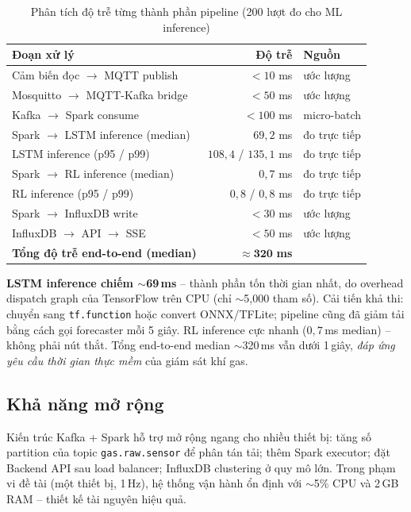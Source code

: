 \begin{table}[H]
\centering
\caption{Phân tích độ trễ từng thành phần pipeline (200 lượt đo cho ML inference)}
\label{tab:latency}
\begin{tabular}{lrl}
\toprule
\textbf{Đoạn xử lý} & \textbf{Độ trễ} & \textbf{Nguồn} \\
\midrule
Cảm biến đọc $\rightarrow$ MQTT publish        & $< 10$ ms      & ước lượng \\
Mosquitto $\rightarrow$ MQTT-Kafka bridge       & $< 50$ ms      & ước lượng \\
Kafka $\rightarrow$ Spark consume               & $< 100$ ms     & micro-batch \\
Spark $\rightarrow$ LSTM inference (median)     & $69{,}2$ ms    & đo trực tiếp \\
\quad LSTM inference (p95 / p99)                & $108{,}4$ / $135{,}1$ ms & đo trực tiếp \\
Spark $\rightarrow$ RL inference (median)       & $0{,}7$ ms     & đo trực tiếp \\
\quad RL inference (p95 / p99)                  & $0{,}8$ / $0{,}8$ ms & đo trực tiếp \\
Spark $\rightarrow$ InfluxDB write              & $< 30$ ms      & ước lượng \\
InfluxDB $\rightarrow$ API $\rightarrow$ SSE    & $< 50$ ms      & ước lượng \\
\midrule
\textbf{Tổng độ trễ end-to-end (median)} & $\approx \mathbf{320}$ \textbf{ms} & \\
\bottomrule
\end{tabular}
\end{table}

\textbf{LSTM inference chiếm $\sim$69\,ms} -- thành phần tốn thời gian nhất, do overhead dispatch graph của TensorFlow trên CPU (chỉ $\sim$5{,}000 tham số). Cải tiến khả thi: chuyển sang \texttt{tf.function} hoặc convert ONNX/TFLite; pipeline cũng đã giảm tải bằng cách gọi forecaster mỗi 5 giây. RL inference cực nhanh ($0{,}7$\,ms median) -- không phải nút thắt. Tổng end-to-end median $\sim$320\,ms vẫn dưới 1\,giây, \emph{đáp ứng yêu cầu thời gian thực mềm} của giám sát khí gas.

\subsection{Khả năng mở rộng}

Kiến trúc Kafka + Spark hỗ trợ mở rộng ngang cho nhiều thiết bị: tăng số partition của topic \texttt{gas.raw.sensor} để phân tán tải; thêm Spark executor; đặt Backend API sau load balancer; InfluxDB clustering ở quy mô lớn. Trong phạm vi đề tài (một thiết bị, 1\,Hz), hệ thống vận hành ổn định với $\sim$5\% CPU và 2\,GB RAM -- thiết kế tài nguyên hiệu quả.

